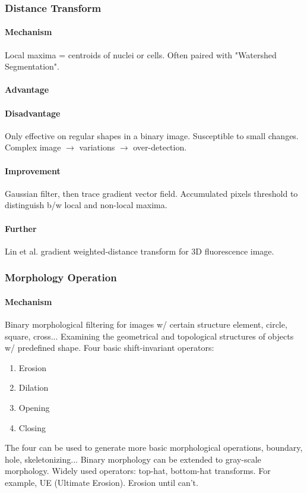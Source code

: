 \documentclass[10pt,a4paper]{article}
\begin{document}
\subsubsection{Distance Transform}
\paragraph{Mechanism}Local maxima = centroids of nuclei or cells. Often paired with "Watershed Segmentation".
\paragraph{Advantage}
\paragraph{Disadvantage}Only effective on regular shapes in a binary image. Susceptible to small changes. Complex image $\to$ variations $\to$ over-detection.
\paragraph{Improvement}Gaussian filter, then trace gradient vector field. Accumulated pixels threshold to distinguish b/w local and non-local maxima.
\paragraph{Further}Lin et al. gradient weighted-distance transform for 3D fluorescence image.

\subsubsection{Morphology Operation}
\paragraph{Mechanism}Binary morphological filtering for images w/ certain structure element, circle, square, cross... Examining the geometrical and topological structures of objects w/ predefined shape. Four basic shift-invariant operators:
\begin{enumerate}
	\item Erosion
	\item Dilation
	\item Opening
	\item Closing
\end{enumerate}
The four can be used to generate more basic morphological operations, boundary, hole, skeletonizing... Binary morphology can be extended to gray-scale morphology. Widely used operators: top-hat, bottom-hat transforms. For example, UE (Ultimate Erosion). Erosion until can't.
\end{document}
